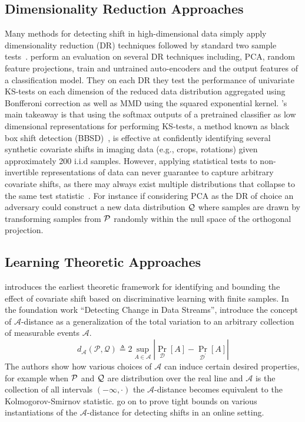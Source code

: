 \subsection*{Dimensionality Reduction Approaches}
Many methods for detecting shift in high-dimensional data simply apply dimensionality reduction (DR) techniques followed by standard two sample tests~\citep{failloud}.
\citeauthor{failloud} perform an evaluation on several DR techniques including, PCA, random feature projections, train and untrained auto-encoders and the output features of a classification model.
They on each DR they test the performance of univariate KS-tests on each dimension of the reduced data distribution aggregated using Bonfferoni correction as well as MMD using the squared exponential kernel.
\citeauthor{failloud}'s main takeaway is that using the softmax outputs of a pretrained classifier as low dimensional representations for performing KS-tests, a method known as black box
shift detection (BBSD)~\citep{bbsd}, is effective at confidently identifying several synthetic covariate shifts in imaging data (e.g., crops, rotations) given approximately 200 i.i.d samples.
However, applying statistical tests to non-invertible representations of data can never guarantee to capture arbitrary covariate shifts, as there may always exist multiple distributions that collapse to
the same test statistic~\citep{failuresofgen}.
For instance if considering PCA as the DR of choice an adversary could construct a new data distribution $\mathcal{Q}$ where samples are drawn by transforming samples from $\mathcal{P}$ randomly within the null space of the orthogonal projection.

\subsection*{Learning Theoretic Approaches}
\cite{domainrep} introduces the earliest theoretic framework for identifying and bounding the effect of covariate shift based on discriminative learning with finite samples.
In the foundation work ``Detecting Change in Data Streams'', \citeauthor{atheory} introduce the concept of $\mathcal{A}$-distance as a generalization of the total variation to an arbitrary collection of measurable events $\mathcal{A}$.
\begin{equation}
    d_{\mathcal{A}}\left(\mathcal{P}, \mathcal{Q} \right)\triangleq2 \sup _{A \in \mathcal{A}}\left|\operatorname{Pr}_{\mathcal{D}}[A]-\operatorname{Pr}_{\mathcal{D}^{\prime}}[A]\right|\label{eq:total-var}
\end{equation}
The authors show how various choices of $\mathcal{A}$ can induce certain desired properties, for example when $\mathcal{P}$ and $\mathcal{Q}$ are distribution over the real line and $\mathcal{A}$ is the collection of all intervals $(-\infty, \cdot)$
the $\mathcal{A}$-distance becomes equivalent to the Kolmogorov-Smirnov statistic.
\citeauthor{atheory} go on to prove tight bounds on various instantiations of the $\mathcal{A}$-distance for detecting shifts in an online setting.

